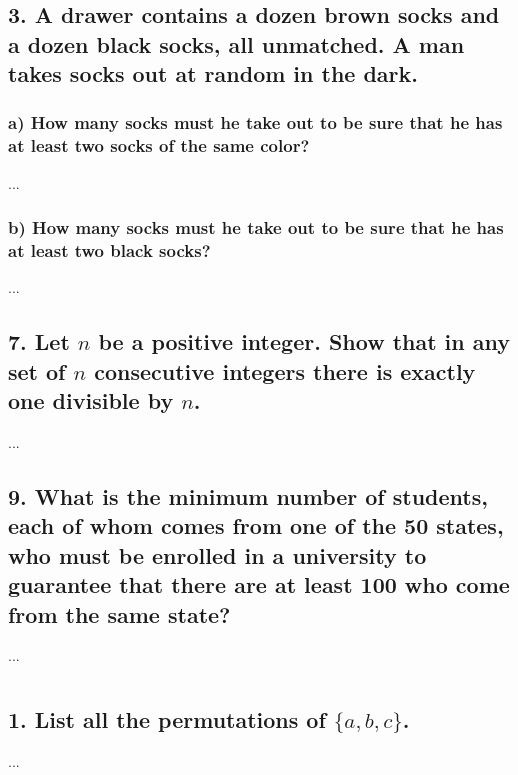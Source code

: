 \documentclass[11pt, oneside]{article} %
\numberwithin{equation}{section} %
\numberwithin{figure}{section} %
\numberwithin{table}{section} %
\begin{document}

\subsection{3. A drawer contains a dozen brown socks and a dozen black socks, all unmatched. A man takes socks out at random in the dark.}
\subsubsection{a) How many socks must he take out to be sure that he
has at least two socks of the same color?}
...

\subsubsection{b) How many socks must he take out to be sure that he has at least two black socks?}
...

\subsection{7. Let $n$ be a positive integer. Show that in any set of $n$ consecutive integers there is exactly one divisible by $n$.}
...

\subsection{9. What is the minimum number of students, each of whom comes from one of the 50 states, who must be enrolled in a university to guarantee that there are at least 100 who come from the same state?}
...

\section{}
\subsection{1. List all the permutations of $\{a, b, c\}$.}
...
\end{document}
